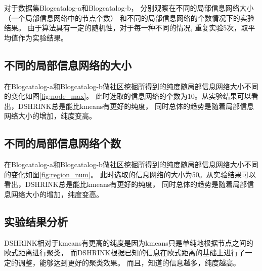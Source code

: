 对于数据集Blogcatalog-a和Blogcatalog-b，
分别观察在不同的局部信息网络大小（一个局部信息网络中的节点个数）
和不同的局部信息网络的个数情况下的实验结果。
由于算法具有一定的随机性，对于每一种不同的情况,
重复实验5次，取平均值作为实验结果。

\subsection{不同的局部信息网络的大小}
\label{sec:results_node_max}

在Blogcatalog-a和Blogcatalog-b做社区挖掘所得到的纯度随局部信息网络大小不同的变化如图\ref{fig:node_max}。
此时选取的信息网络的个数为10。从实验结果可以看出，DSHRINK总是能比kmeans有更好的纯度，
同时总体的趋势是随着局部信息网络大小的增加，纯度变高。

\begin{figure}
  \centering
\end{figure}

\subsection{不同的局部信息网络个数}
\label{sec:results_region_num}

在Blogcatalog-a和Blogcatalog-b做社区挖掘所得到的纯度随局部信息网络大小不同的变化如图\ref{fig:region_num}。
此时选取的信息网络的大小为50。从实验结果可以看出，DSHRINK总是能比kmeans有更好的纯度，
同时总体的趋势是随着局部信息网络大小的增加，纯度变高。

\begin{figure}
  \centering
\end{figure}

\subsection{实验结果分析}

DSHRINK相对于kmeans有更高的纯度是因为kmeans只是单纯地根据节点之间的欧式距离进行聚类，
而DSHRINK根据已知的信息在欧式距离的基础上进行了一定的调整，能够达到更好的聚类效果。
而且，知道的信息越多，纯度越高。

